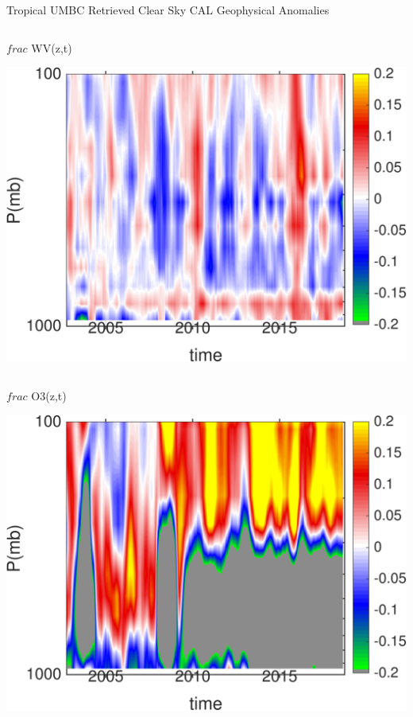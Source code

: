 \documentclass[10pt,t]{beamer}
\begin{document}
\begin{frame}{Tropical UMBC Retrieved Clear Sky CAL Geophysical Anomalies}
\begin{columns}
\begin{column}{0.45\columnwidth}
\begin{block}{\footnotesize $frac$ WV(z,t)}
\vspace{-0.1in}
\begin{center}
\includegraphics[width=\linewidth]{Figs/ClearAnom/umbc_clr_retr_cal_wv_anom_200209_201808.png}
\end{center}
\end{block}
\end{column}
\end{columns}

\vspace{-0.25in}

\begin{columns}
\begin{column}{0.45\columnwidth}
\begin{block}{\footnotesize $frac$ O3(z,t)}
\vspace{-0.1in}
\begin{center}
\includegraphics[width=\linewidth]{Figs/ClearAnom/umbc_clr_retr_cal_o3_anom_200209_201808.png}
\end{center}
\end{block}
\end{column}


\end{columns}
\end{frame}
\end{document}
